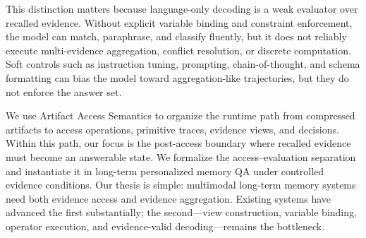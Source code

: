 This distinction matters because language-only decoding is a weak evaluator over recalled evidence.
Without explicit variable binding and constraint enforcement, the model can match, paraphrase, and classify fluently, but it does not reliably execute multi-evidence aggregation, conflict resolution, or discrete computation.
Soft controls such as instruction tuning, prompting, chain-of-thought, and schema formatting can bias the model toward aggregation-like trajectories, but they do not enforce the answer set.

We use Artifact Access Semantics to organize the runtime path from compressed artifacts to access operations, primitive traces, evidence views, and decisions.
Within this path, our focus is the post-access boundary where recalled evidence must become an answerable state.
We formalize the access--evaluation separation and instantiate it in long-term personalized memory QA under controlled evidence conditions.
Our thesis is simple: multimodal long-term memory systems need both evidence access and evidence aggregation.
Existing systems have advanced the first substantially; the second---view construction, variable binding, operator execution, and evidence-valid decoding---remains the bottleneck.
